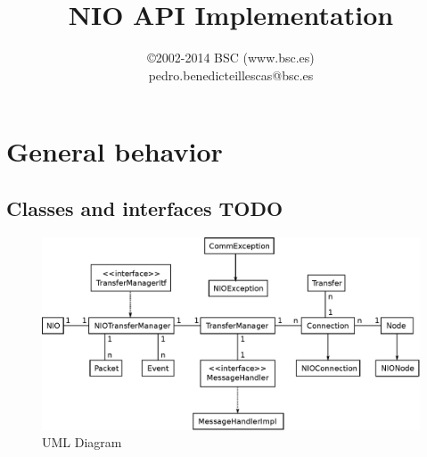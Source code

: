 \documentclass[11pt]{article}
\title{\textbf{NIO API Implementation}}
\author{\copyright 2002-2014 BSC (www.bsc.es)\\pedro.benedicteillescas@bsc.es}
\date{}
\begin{document}
\maketitle
\tableofcontents
\listoffigures
\clearpage

\section{General behavior}
\label{sec:general_behavior}

	\subsection{Classes and interfaces TODO}
		\begin{figure}[H]
		\centering
		\includegraphics[width=160mm]{img/drawing8.eps}
		\caption[UML Diagram]{UML Diagram}
		\label{drawing8}
		\end{figure}
\end{document}
